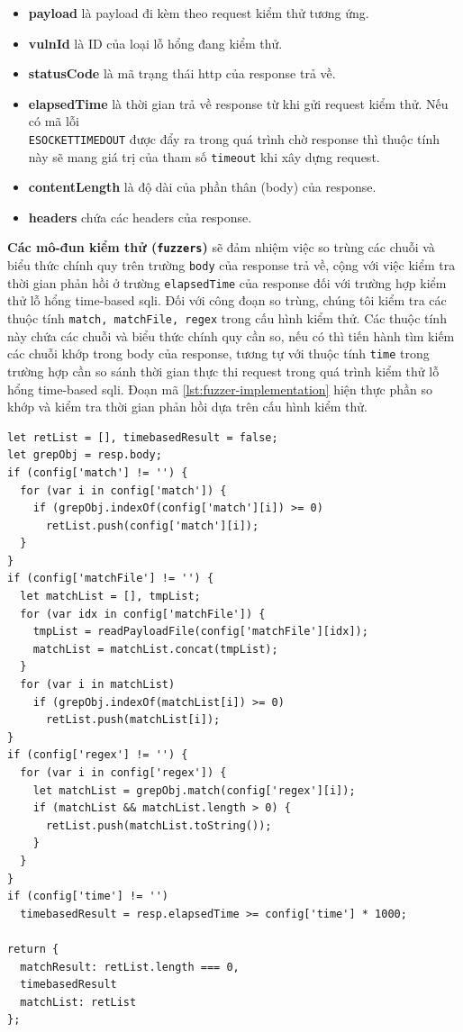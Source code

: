 \begin{itemize}
  \item \textbf{payload} là payload đi kèm theo request kiểm thử tương ứng.
  \item \textbf{vulnId} là ID của loại lỗ hổng đang kiểm thử.
  \item \textbf{statusCode} là mã trạng thái \acrshort{http} của response trả về.
  \item \textbf{elapsedTime} là thời gian trả về response từ khi gửi request kiểm thử. Nếu có mã lỗi\\\texttt{ESOCKETTIMEDOUT} được đẩy ra trong quá trình chờ response thì thuộc tính này sẽ mang giá trị của tham số \texttt{timeout} khi xây dựng request.
  \item \textbf{contentLength} là độ dài của phần thân (body) của response.
  \item \textbf{headers} chứa các headers của response.
\end{itemize}
\textbf{Các mô-đun kiểm thử (\texttt{fuzzers})} sẽ đảm nhiệm việc so trùng các chuỗi và biểu thức chính quy trên trường \texttt{body} của response trả về, cộng với việc kiểm tra thời gian phản hồi ở trường \texttt{elapsedTime} của response đối với trường hợp kiểm thử lỗ hổng time-based \acrshort{sqli}. Đối với công đoạn so trùng, chúng tôi kiểm tra các thuộc tính \texttt{match, matchFile, regex} trong cấu hình kiểm thử. Các thuộc tính này chứa các chuỗi và biểu thức chính quy cần so, nếu có thì tiến hành tìm kiếm các chuỗi khớp trong body của response, tương tự với thuộc tính \texttt{time} trong trường hợp cần so sánh thời gian thực thi request trong quá trình kiểm thử lỗ hổng time-based \acrshort{sqli}. Đoạn mã \ref{lst:fuzzer-implementation} hiện thực phần so khớp và kiểm tra thời gian phản hồi dựa trên cấu hình kiểm thử. 
\begin{lstlisting}[style=ES6, label={lst:fuzzer-implementation}, caption={Hiện thực các mô-đun kiểm thử}]
let retList = [], timebasedResult = false;
let grepObj = resp.body;
if (config['match'] != '') {
  for (var i in config['match']) {
    if (grepObj.indexOf(config['match'][i]) >= 0) 
      retList.push(config['match'][i]);
  }
}
if (config['matchFile'] != '') {
  let matchList = [], tmpList;
  for (var idx in config['matchFile']) {
    tmpList = readPayloadFile(config['matchFile'][idx]);
    matchList = matchList.concat(tmpList);
  }
  for (var i in matchList)
    if (grepObj.indexOf(matchList[i]) >= 0) 
      retList.push(matchList[i]);
}
if (config['regex'] != '') {
  for (var i in config['regex']) {
    let matchList = grepObj.match(config['regex'][i]);
    if (matchList && matchList.length > 0) {
      retList.push(matchList.toString());
    }
  }
}
if (config['time'] != '') 
  timebasedResult = resp.elapsedTime >= config['time'] * 1000;

return { 
  matchResult: retList.length === 0,
  timebasedResult
  matchList: retList
};
\end{lstlisting}
